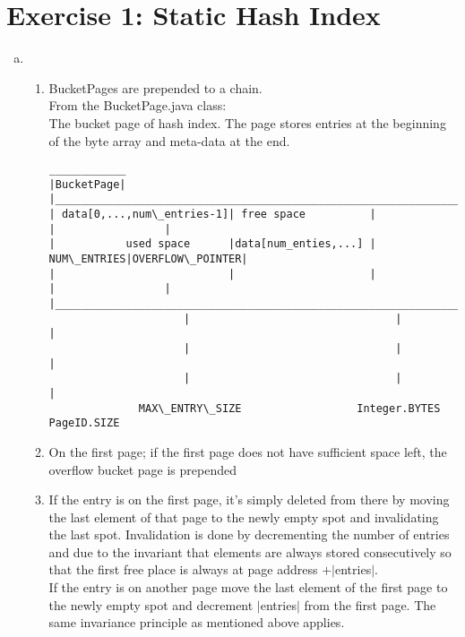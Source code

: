 \documentclass[a4paper]{article}
\begin{document}
	\section*{Exercise 1: Static Hash Index}\label{sec:exercise1}
   \begin{enumerate}[a.]
		\item 
            \begin{enumerate}
                \item BucketPages are prepended to a chain.\\
                    From the BucketPage.java class:\\
                     The bucket page of hash index. The page stores entries at the beginning of the byte array and
                     meta-data at the end.
\begin{lstlisting}[basicstyle=\tiny]
____________
|BucketPage|
|__________________________________________________________________________________
| data[0,...,num\_entries-1]| free space          |             |                 |
|           used space      |data[num_enties,...] | NUM\_ENTRIES|OVERFLOW\_POINTER|
|                           |                     |             |                 |
|__________________________________________________________________________________
                     |                                |               |
                     |                                |               |
                     |                                |               |
              MAX\_ENTRY\_SIZE                  Integer.BYTES    PageID.SIZE
\end{lstlisting}
                \item
                    On the first page; if the first page does not have sufficient space left, the overflow bucket page is prepended
                \item
                    If the entry is on the first page, it's simply deleted from there by moving the last element of that page to the newly empty spot and invalidating the last spot. 
                    Invalidation is done by decrementing the number of entries and due to the invariant that elements are always stored consecutively so that the first free 
                    place is always at page address $+ |$entries$|$. \\
                    If the entry is on another page move the last element of the first page to the newly empty spot and decrement $|$entries$|$ from the first page. The same 
                    invariance principle as mentioned above applies.

\end{enumerate}
\end{enumerate}
\end{document}
